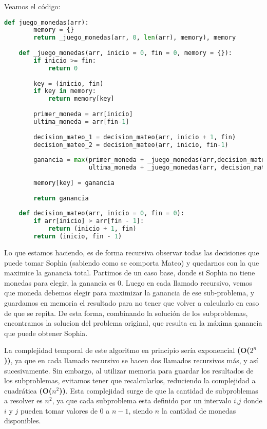 Veamos el código:
\vskip0.25cm
\begin{lstlisting}[language=Python]
    def juego_monedas(arr):
        memory = {}
        return _juego_monedas(arr, 0, len(arr), memory), memory
    
    def _juego_monedas(arr, inicio = 0, fin = 0, memory = {}):
        if inicio >= fin:
            return 0
        
        key = (inicio, fin)
        if key in memory:
            return memory[key]
    
        primer_moneda = arr[inicio]
        ultima_moneda = arr[fin-1]
        
        decision_mateo_1 = decision_mateo(arr, inicio + 1, fin)
        decision_mateo_2 = decision_mateo(arr, inicio, fin-1)
    
        ganancia = max(primer_moneda + _juego_monedas(arr,decision_mateo_1[0],decision_mateo_1[1], memory), 
                       ultima_moneda + _juego_monedas(arr, decision_mateo_2[0], decision_mateo_2[1], memory))
        
        memory[key] = ganancia
    
        return ganancia
        
    def decision_mateo(arr, inicio = 0, fin = 0):
        if arr[inicio] > arr[fin - 1]:
            return (inicio + 1, fin)
        return (inicio, fin - 1)    
\end{lstlisting}
\vskip0.25cm
Lo que estamos haciendo, es de forma recursiva observar todas las decisiones que puede tomar Sophia (sabiendo como se comporta Mateo) y quedarnos con la que maximice la ganancia total. 
Partimos de un caso base, donde si Sophia no tiene monedas para elegir, la ganancia es 0.
Luego en cada llamado recursivo, vemos que moneda debemos elegir para maximizar la ganancia de ese sub-problema, y guardamos en memoria el resultado para no tener que volver a calcularlo en caso de que se repita. De esta forma, combinando la solución de los subproblemas, encontramos la solucion del problema original, que resulta en la máxima ganancia que puede obtener Sophia.


La complejidad temporal de este algoritmo en principio sería exponencial \textbf{(O($2^n$))}, ya que en cada llamado recursivo se hacen dos llamados recursivos más, y así sucesivamente.
Sin embargo, al utilizar memoria para guardar los resultados de los subproblemas, evitamos tener que recalcularlos, reduciendo la complejidad a cuadrática \textbf{(O($n^2$))}. Esta complejidad surge de que la cantidad de subproblemas a resolver es $n^2$, ya que cada subproblema esta definido por un intervalo $i$,$j$ donde $i$ y $j$ pueden tomar valores de 0 a $n-1$, siendo $n$ la cantidad de monedas disponibles.

